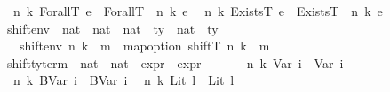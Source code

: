 \begin{isabellebody}
{\isacharbar}{\kern0pt}\ {\isachardoublequoteopen}{\isasymup}\ n\ k\ {\isacharparenleft}{\kern0pt}ForallT\ e{\isacharparenright}{\kern0pt}\ {\isacharequal}{\kern0pt}\ {\isacharparenleft}{\kern0pt}ForallT\ {\isacharparenleft}{\kern0pt}{\isasymup}\ n\ k\ e{\isacharparenright}{\kern0pt}{\isacharparenright}{\kern0pt}{\isachardoublequoteclose}\isanewline
{\isacharbar}{\kern0pt}\ {\isachardoublequoteopen}{\isasymup}\ n\ k\ {\isacharparenleft}{\kern0pt}ExistsT\ e{\isacharparenright}{\kern0pt}\ {\isacharequal}{\kern0pt}\ {\isacharparenleft}{\kern0pt}ExistsT\ {\isacharparenleft}{\kern0pt}{\isasymup}\ n\ k\ e{\isacharparenright}{\kern0pt}{\isacharparenright}{\kern0pt}{\isachardoublequoteclose}\isanewline
\isanewline
{}\isamarkupfalse%
\ shift{\isacharunderscore}{\kern0pt}env\ {\isacharcolon}{\kern0pt}{\isacharcolon}{\kern0pt}\ {\isachardoublequoteopen}nat\ {\isasymRightarrow}\ nat\ {\isasymRightarrow}\ {\isacharparenleft}{\kern0pt}nat\ {\isasymrightharpoonup}\ ty{\isacharparenright}{\kern0pt}\ {\isasymRightarrow}\ {\isacharparenleft}{\kern0pt}nat\ {\isasymrightharpoonup}\ ty{\isacharparenright}{\kern0pt}{\isachardoublequoteclose}\isanewline
\ \ \ {\isachardoublequoteopen}shift{\isacharunderscore}{\kern0pt}env\ n\ k\ {\isasymDelta}\ m\ {\isacharequal}{\kern0pt}\ map{\isacharunderscore}{\kern0pt}option\ {\isacharparenleft}{\kern0pt}shiftT\ n\ k{\isacharparenright}{\kern0pt}\ {\isacharparenleft}{\kern0pt}{\isasymDelta}\ m{\isacharparenright}{\kern0pt}{\isachardoublequoteclose}\isanewline
\isanewline
{}\isamarkupfalse%
\ shift{\isacharunderscore}{\kern0pt}ty{\isacharunderscore}{\kern0pt}term\ {\isacharcolon}{\kern0pt}{\isacharcolon}{\kern0pt}\ {\isachardoublequoteopen}nat\ {\isasymRightarrow}\ nat\ {\isasymRightarrow}\ expr\ {\isasymRightarrow}\ expr{\isachardoublequoteclose}\ {\isacharparenleft}{\kern0pt}{\isachardoublequoteopen}{\isasymup}\isactrlsub {\isasymtau}{\isachardoublequoteclose}{\isacharparenright}{\kern0pt}\isanewline
\ \ \isanewline
\ \ {\isachardoublequoteopen}{\isasymup}\isactrlsub {\isasymtau}\ n\ k\ {\isacharparenleft}{\kern0pt}Var\ i{\isacharparenright}{\kern0pt}\ {\isacharequal}{\kern0pt}\ Var\ i{\isachardoublequoteclose}\isanewline
{\isacharbar}{\kern0pt}\ {\isachardoublequoteopen}{\isasymup}\isactrlsub {\isasymtau}\ n\ k\ {\isacharparenleft}{\kern0pt}BVar\ i{\isacharparenright}{\kern0pt}\ {\isacharequal}{\kern0pt}\ BVar\ i{\isachardoublequoteclose}\isanewline
{\isacharbar}{\kern0pt}\ {\isachardoublequoteopen}{\isasymup}\isactrlsub {\isasymtau}\ n\ k\ {\isacharparenleft}{\kern0pt}Lit\ l{\isacharparenright}{\kern0pt}\ {\isacharequal}{\kern0pt}\ {\isacharparenleft}{\kern0pt}Lit\ l{\isacharparenright}{\kern0pt}{\isachardoublequoteclose}\isanewline

\end{isabellebody}
